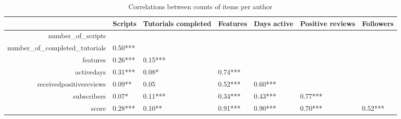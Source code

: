 \begin{table}[ht]
\centering
\begin{tabular}{rllllll}
  \hline
 & Scripts & Tutorials completed & Features & Days active & Positive reviews & Followers \\ 
  \hline
number\_of\_scripts &  &  &  &  &  &  \\ 
  number\_of\_completed\_tutorials &  0.50*** &  &  &  &  &  \\ 
  features &  0.26*** &  0.15*** &  &  &  &  \\ 
  activedays &  0.31*** &  0.08*  &  0.74*** &  &  &  \\ 
  receivedpositivereviews &  0.09**  &  0.05  &  0.52*** &  0.60*** &  &  \\ 
  subscribers &  0.07*  &  0.11*** &  0.34*** &  0.43*** &  0.77*** &  \\ 
  score &  0.28*** &  0.10**  &  0.91*** &  0.90*** &  0.70*** &  0.52*** \\ 
   \hline
\end{tabular}
\label{tab:correlations_author}
\caption{Correlations between counts of items per author }
\end{table}







